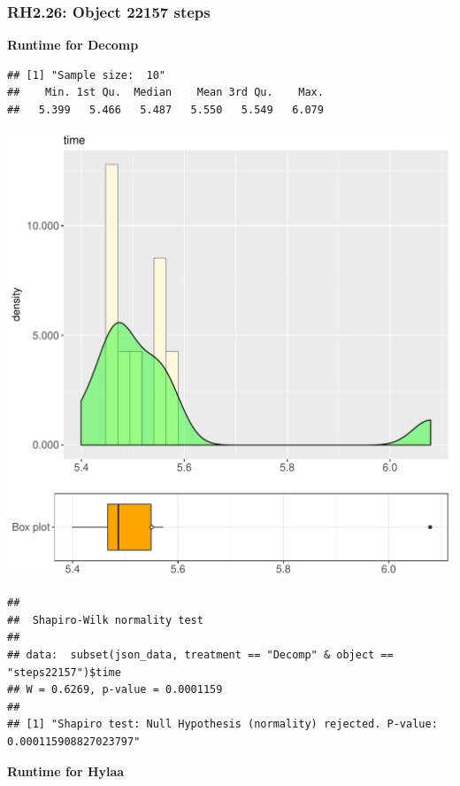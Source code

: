 \documentclass{article}\usepackage[]{graphicx}\usepackage[]{color}
\makeatletter
\def\maxwidth{ %
  \ifdim\Gin@nat@width>\linewidth
    \linewidth
  \else
    \Gin@nat@width
  \fi
}
\newenvironment{kframe}{%
 \def\at@end@of@kframe{}%
 \ifinner\ifhmode%
  \def\at@end@of@kframe{\end{minipage}}%
  \begin{minipage}{\columnwidth}%
 \fi\fi%
 \def\FrameCommand##1{\hskip\@totalleftmargin \hskip-\fboxsep
 \colorbox{shadecolor}{##1}\hskip-\fboxsep
     \hskip-\linewidth \hskip-\@totalleftmargin \hskip\columnwidth}%
 \MakeFramed {\advance\hsize-\width
   \@totalleftmargin\z@ \linewidth\hsize
   \@setminipage}}%
 {\par\unskip\endMakeFramed%
 \at@end@of@kframe}
\newenvironment{knitrout}{}{} %
\makeatother
\begin{document}
\subsubsection{RH2.26: Object 22157 steps}

 \textbf{Runtime for Decomp}
\begin{knitrout}
\color{fgcolor}\begin{kframe}
\begin{verbatim}
## [1] "Sample size:  10"
##    Min. 1st Qu.  Median    Mean 3rd Qu.    Max. 
##   5.399   5.466   5.487   5.550   5.549   6.079
\end{verbatim}
\end{kframe}
\includegraphics[width=\maxwidth]{figure/RH2_Decomp_steps22157-1} 
\begin{kframe}\begin{verbatim}
## 
## 	Shapiro-Wilk normality test
## 
## data:  subset(json_data, treatment == "Decomp" & object == "steps22157")$time
## W = 0.6269, p-value = 0.0001159
## 
## [1] "Shapiro test: Null Hypothesis (normality) rejected. P-value: 0.000115908827023797"
\end{verbatim}
\end{kframe}
\end{knitrout}
 \textbf{Runtime for Hylaa}
\end{document}
